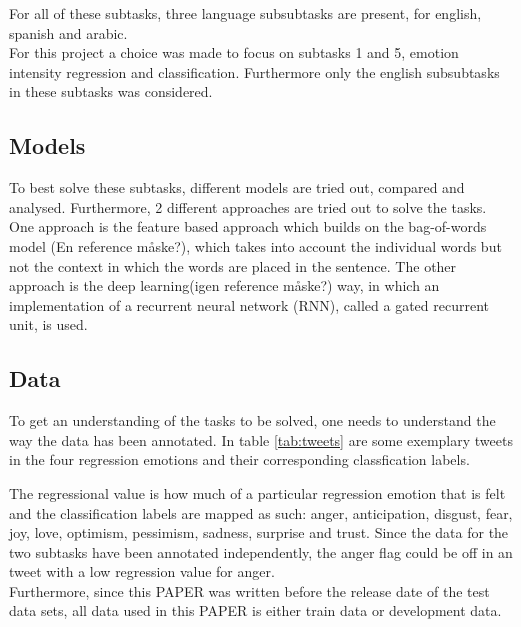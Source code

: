 For all of these subtasks, three language subsubtasks are present, for english, spanish and arabic.\\ 
For this project a choice was made to focus on subtasks 1 and 5, emotion intensity regression and classification. Furthermore only the english subsubtasks in these subtasks was considered.
\subsection{Models}
To best solve these subtasks, different models are tried out, compared and analysed. Furthermore, 2 different approaches are tried out to solve the tasks. One approach is the feature based approach which builds on the bag-of-words model (En reference måske?), which takes into account the individual words but not the context in which the words are placed in the sentence. The other approach is the deep learning(igen reference måske?) way, in which an implementation of a recurrent neural network (RNN), called a gated recurrent unit, is used.

\subsection{Data} \label{sec:introdata}
To get an understanding of the tasks to be solved, one needs to understand the way the data has been annotated. In table \ref{tab:tweets} are some exemplary tweets in the four regression emotions and their corresponding classfication labels.\\
\begin{table}[h]
\caption{Exemplary tweets with regression and clasification labels}
\label{tab:tweets}
\end{table}
The regressional value is how much of a particular regression emotion that is felt and the classification labels are mapped as such: anger, anticipation, disgust, fear, joy, love, optimism, pessimism, sadness, surprise and trust. Since the data for the two subtasks have been annotated independently, the anger flag could be off in an tweet with a low regression value for anger. \\
Furthermore, since this PAPER was written before the release date of the test data sets, all data used in this PAPER is either train data or development data.
